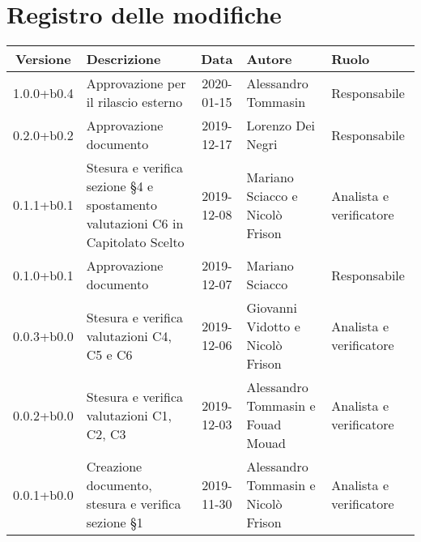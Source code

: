 \section*{Registro delle modifiche}

\begin{center}
	\begin{longtable}{|c|p{3.5cm}|c|p{3cm}|p{3cm}|}
	\hline
	\rowcolor{lighter-grayer}
	\textbf{Versione} & \textbf{Descrizione} & \textbf{Data} & \textbf{Autore} & \textbf{Ruolo} \\
	\hline
	\endfirsthead

	1.0.0+b0.4 & Approvazione per il rilascio esterno & 2020-01-15 & Alessandro Tommasin & Responsabile \\
	\hline
	0.2.0+b0.2 & Approvazione documento & 2019-12-17 & Lorenzo Dei Negri & Responsabile \\
	\hline
	0.1.1+b0.1 & Stesura e verifica sezione \S4 e spostamento valutazioni C6 in Capitolato Scelto & 2019-12-08 & Mariano Sciacco e Nicolò Frison & Analista e verificatore \\
	\hline
	0.1.0+b0.1 & Approvazione documento & 2019-12-07 & Mariano Sciacco & Responsabile \\
	\hline 
	0.0.3+b0.0 & Stesura e verifica valutazioni C4, C5 e C6 & 2019-12-06 & Giovanni Vidotto e Nicolò Frison & Analista e verificatore \\
	\hline
	0.0.2+b0.0 & Stesura e verifica valutazioni C1, C2, C3 & 2019-12-03 & Alessandro Tommasin e Fouad Mouad & Analista e verificatore \\
	\hline
	0.0.1+b0.0 & Creazione documento, stesura e verifica sezione \S1 & 2019-11-30 & Alessandro Tommasin e Nicolò Frison & Analista e verificatore \\
	\hline

	\end{longtable}
\end{center}
